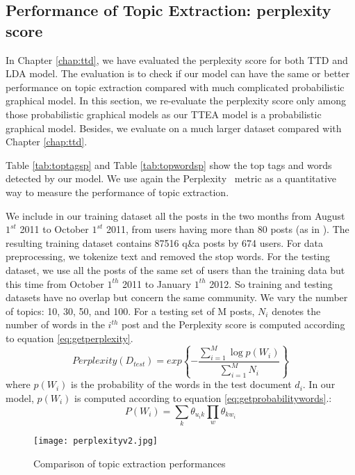 {{{{{{{\subsection{Performance of Topic Extraction: perplexity score}

In Chapter \ref{chap:ttd}, we have evaluated the perplexity score for both TTD and LDA model. The evaluation is to check if our model can have the same or better performance on topic extraction compared with much complicated probabilistic graphical model. In this section, we re-evaluate the perplexity score only among those probabilistic graphical models as our TTEA model is a probabilistic graphical model. Besides, we evaluate on a much larger dataset compared with Chapter \ref{chap:ttd}.

Table \ref{tab:toptagsp} and Table \ref{tab:topwordsp} show the top tags and words detected by our model. We use again the Perplexity~\cite{blei2003latent} metric as a quantitative way to measure the performance of topic extraction.

We include in our training dataset all the posts in the two months from August $1^{st}$ 2011 to October $1^{st}$ 2011, from users having more than 80 posts (as in \cite{yang2013cqarank}).
The resulting training dataset contains 87516 q\&a posts by 674 users. For data preprocessing, we tokenize text and removed the stop words. For the testing dataset, we use all the posts of the same set of users than the training data but this time from October $1^{th}$ 2011 to January $1^{th}$ 2012. So training and testing datasets have no overlap but concern the same community. We vary the number of topics: 10, 30, 50, and 100. 
For a testing set of M posts, $N_i$ denotes the number of words in the $i^{th}$ post and the Perplexity score is computed according to equation \ref{eq:getperplexity}.
\begin{equation} %
  Perplexity(D_{test})=exp\left\{-\frac{\sum_{i=1}^{M}\log p(W_i)}{\sum_{i=1}^{M}N_i}\right\}
\label{eq:getperplexity}
\end{equation}
where $p(W_i)$ is the probability of the words in the test document $d_i$. In our model, $p(W_i)$ is computed according to equation \ref{eq:getprobabilitywords}.:%
\begin{equation}%
  P(W_i)=\sum_{k}\theta_{u_ik}\prod_{w} \theta_{kw_i}
\label{eq:getprobabilitywords}
\end{equation}
\begin{figure}[htp]
\centering
\texttt{[image: perplexityv2.jpg]}  %
\caption{Comparison of topic extraction performances}
\label{fig:perplexity} %
\end{figure}



}}}}}}}
